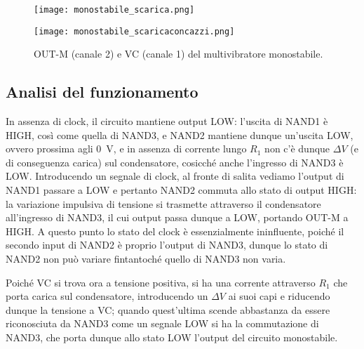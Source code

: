 \begin{figure}[H]
	\centering
	\begin{minipage}{0.47\textwidth}
		\centering
		\texttt{[image: monostabile\_scarica.png]}
	\end{minipage}
	\begin{minipage}{0.47\textwidth}
		\centering
		\texttt{[image: monostabile\_scaricaconcazzi.png]}
	\end{minipage}
	\caption{OUT-M (canale 2) e VC (canale 1) del multivibratore monostabile.}
	\label{monoscarica}
\end{figure}

\subsection{Analisi del funzionamento}

In assenza di clock, il circuito mantiene output LOW: l'uscita di NAND1 è HIGH,
così come quella di NAND3, e NAND2 mantiene dunque un'uscita LOW,
ovvero prossima agli \SI{0}{\V}, e in assenza di corrente lungo $R_1$ non c'è
dunque $\Delta V$ (e di conseguenza carica) sul condensatore, cosicché anche
l'ingresso di NAND3 è LOW. Introducendo un
segnale di clock, al fronte di salita vediamo l'output di NAND1 passare a LOW e
pertanto NAND2 commuta allo stato di output HIGH: la variazione impulsiva di
tensione si trasmette attraverso il condensatore all'ingresso di NAND3, il cui
output passa dunque a LOW, portando OUT-M a HIGH. A questo punto lo stato
del clock è essenzialmente ininfluente, poiché il secondo input di NAND2 è
proprio l'output di NAND3, dunque lo stato di NAND2 non può variare fintantoché
quello di NAND3 non varia.

Poiché VC si trova ora a tensione positiva, si ha una corrente attraverso $R_1$
che porta carica sul condensatore, introducendo un $\Delta V$ ai suoi
capi e riducendo dunque la tensione a VC; quando quest'ultima scende abbastanza
da essere riconosciuta da NAND3 come un segnale LOW si ha la commutazione di
NAND3, che porta dunque allo stato LOW l'output del circuito monostabile.

